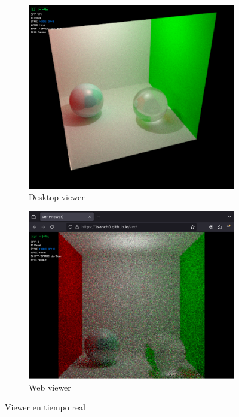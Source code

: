 \documentclass{article}
\begin{document}
\begin{figure}[h]
  \begin{subfigure}[h]{0.4\linewidth}
    \includegraphics[width=\linewidth]{imgs/viewer.png}
    \caption{Desktop viewer}
  \end{subfigure}
  \hfill
  \begin{subfigure}[h]{0.4\linewidth}
    \includegraphics[width=\linewidth]{imgs/wviewer.png}
    \caption{Web viewer}
  \end{subfigure}
  \caption{Viewer en tiempo real}
\end{figure}
\end{document}
